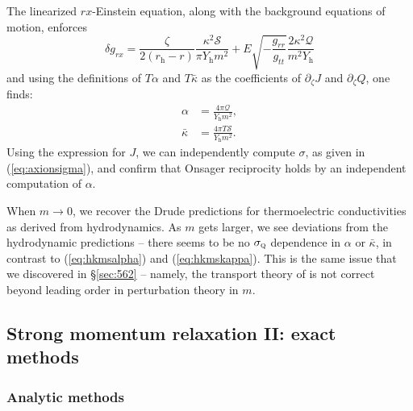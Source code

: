 \documentclass[10pt, oneside]{book}
\begin{document}
\begin{doublespace}
\begin{equation}
\end{equation}
The linearized $rx$-Einstein equation, along with the background equations of motion, enforces \begin{equation}
\delta g_{rx} =  \frac{\zeta}{2(r_{\mathrm{h}}-r)}\frac{\kappa^2\mathcal{S}}{\pi Y_{\mathrm{h}}m^2} + E \sqrt{-\frac{g_{rr}}{g_{tt}}} \frac{2\kappa^2 \mathcal{Q}}{m^2Y_{\mathrm{h}}}
\end{equation}
and using the definitions of $T\alpha$ and $T\bar\kappa$ as the coefficients of $\partial_\zeta J$ and $\partial_\zeta Q$, one finds: \begin{subequations}\label{eq:thermoelectricaxion}\begin{align}
 \alpha &= \frac{4\pi \mathcal{Q}}{Y_{\mathrm{h}}m^2}, \\
 \bar\kappa &= \frac{4\pi T\mathcal{S}}{Y_{\mathrm{h}}m^2}.
 \end{align}\end{subequations}
 Using the expression for $J$, we can independently compute $\sigma$, as given in (\ref{eq:axionsigma}), and confirm that Onsager reciprocity holds by an independent computation of $\alpha$.   

When $m \rightarrow 0$,  we recover the Drude predictions for thermoelectric conductivities as derived from hydrodynamics.   As $m$ gets larger, we see deviations from the hydrodynamic predictions -- there seems to be no $\sigma_{\textsc{q}}$ dependence in $\alpha$ or $\bar\kappa$, in contrast to (\ref{eq:hkmsalpha}) and (\ref{eq:hkmskappa}).    This is the same issue that we discovered in \S \ref{sec:562} -- namely, the transport theory of \cite{hkms} is not correct beyond leading order in perturbation theory in $m$.    
 
\subsection{Strong momentum relaxation II: exact methods}

\subsubsection{Analytic methods} \label{sec:analyticstrongII}


\end{doublespace}
\end{document}
